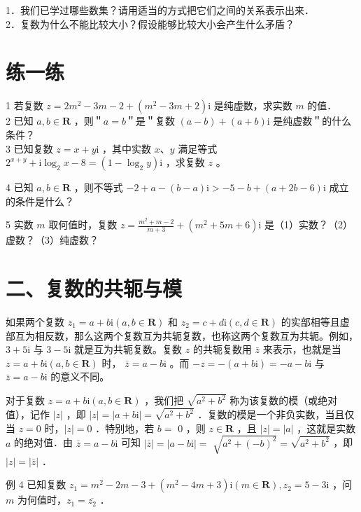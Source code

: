 \documentclass[10pt]{article}
\begin{document}
1．我们已学过哪些数集？请用适当的方式把它们之间的关系表示出来．\\
2．复数为什么不能比较大小？假设能够比较大小会产生什么矛盾？

\section*{练一练}
1 若复数 \(z=2 m^{2}-3 m-2+\left(m^{2}-3 m+2\right) \mathrm{i}\) 是纯虚数，求实数 \(m\) 的值．\\
2 已知 \(a, b \in \mathbf{R}\) ，则＂\(a=b\)＂是＂复数 \((a-b)+(a+b) \mathrm{i}\) 是纯虚数＂的什么条件？\\
3 已知复数 \(z=x+y \mathrm{i}\) ，其中实数 \(x 、 y\) 满足等式 \(2^{x+y}+\mathrm{i} \log _{2} x-8=\left(1-\log _{2} y\right) \mathrm{i}\) ，求复数 \(z\) 。

4 已知 \(a, b \in \mathbf{R}\) ，则不等式 \(-2+a-(b-a) \mathrm{i}>-5-b+(a+2 b-6) \mathrm{i}\) 成立的条件是什么？

5 实数 \(m\) 取何值时，复数 \(z=\frac{m^{2}+m-2}{m+3}+\left(m^{2}+5 m+6\right) \mathrm{i}\) 是（1）实数？（2）虚数？（3）纯虚数？

\section*{二、复数的共轭与模}
如果两个复数 \(z_{1}=a+b \mathrm{i}(a, b \in \mathbf{R})\) 和 \(z_{2}=c+d \mathrm{i}(c, d \in \mathbf{R})\) 的实部相等且虚部互为相反数，那么这两个复数互为共轭复数，也称这两个复数互为共轭。例如， \(3+5 \mathrm{i}\) 与 \(3-5 \mathrm{i}\) 就是互为共轭复数。复数 \(z\) 的共轭复数用 \(\bar{z}\) 来表示，也就是当 \(z=a+b \mathrm{i}(a, b \in \mathbf{R})\) 时， \(\bar{z}=a-b \mathrm{i}\) 。而 \(-z=-(a+b \mathrm{i})=-a-b \mathrm{i}\) 与 \(\bar{z}=a-b \mathrm{i}\) 的意义不同。

对于复数 \(z=a+b \mathrm{i}(a, b \in \mathbf{R})\) ，我们把 \(\sqrt{a^{2}+b^{2}}\) 称为该复数的模（或绝对值），记作 \(|z|\) ，即 \(|z|=|a+b \mathrm{i}|=\sqrt{a^{2}+b^{2}}\) ．复数的模是一个非负实数，当且仅当 \(z=0\) 时，\(|z|=0\) ．特别地，若 \(b=\) 0 ，则 \(z \in \mathbf{R}\) ，且 \(|z|=|a|\) ，这就是实数 \(a\) 的绝对值．由 \(\bar{z}=a-b \mathrm{i}\) 可知 \(|\bar{z}|=|a-b \mathrm{i}|=\) \(\sqrt{a^{2}+(-b)^{2}}=\sqrt{a^{2}+b^{2}}\) ，即 \(|z|=|\bar{z}|\) ．

例 4 已知复数 \(z_{1}=m^{2}-2 m-3+\left(m^{2}-4 m+3\right) \mathrm{i}(m \in \mathbf{R}), z_{2}=5-3 \mathrm{i}\) ，问 \(m\) 为何值时，\(z_{1}=\overline{z_{2}}\) ．
\end{document}
